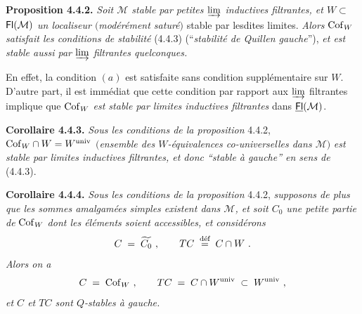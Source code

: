 \textbf{Proposition 4.4.2.} \textit{Soit $\mathcal{M}$ stable par petites $\varinjlim$ inductives filtrantes, et $W\subset$} $\mathsf{Fl}(\mathcal{M})$ \textit{un localiseur $($modérément saturé$)$} stable par lesdites limites. \textit{Alors} $\mathrm{Cof}_W$ \textit{satisfait les conditions de stabilité} (4.4.3) (“\textit{stabilité de Quillen gauche}”), \textit{et est stable aussi par $\varinjlim$ filtrantes quelconques.}

En effet, la condition $(a)$ est satisfaite sans condition supplémentaire sur $W$. D'autre part, il est immédiat que cette condition par rapport aux $\varinjlim$ filtrantes implique que $\mathrm{Cof}_W$ \textit{est stable par limites inductives filtrantes} dans $\underline{\mathsf{Fl}}(\mathcal{M})$.

\textbf{Corollaire 4.4.3.} \textit{Sous les conditions de la proposition} 4.4.2, $\mathrm{Cof}_W\cap W=W^{\mathrm{univ}}$ $($\textit{ensemble des $W$-équivalences co-universelles dans $\mathcal{M}$}$)$ \textit{est stable par limites inductives filtrantes, et donc “stable à gauche” en sens de} (4.4.3).

\textbf{Corollaire 4.4.4.} \textit{Sous les conditions de la proposition} 4.4.2, \textit{supposons de plus que les sommes amalgamées simples existent dans $\mathcal{M}$, et soit $C_0$ une petite partie de} $\mathrm{Cof}_W$ \textit{dont les éléments soient accessibles, et considérons}
\[
C\;=\;\widetilde{C_0}\ ,\qquad TC\;\deq\;C\cap W\ .
\]
\textit{Alors on a}
\[
C\;=\;\mathrm{Cof}_W\ ,\qquad TC\;=\;C\cap W^{\mathrm{univ}}\;\subset\;W^{\mathrm{univ}}\ ,
\]
\textit{et $C$ et $TC$ sont $Q$-stables à gauche.}

